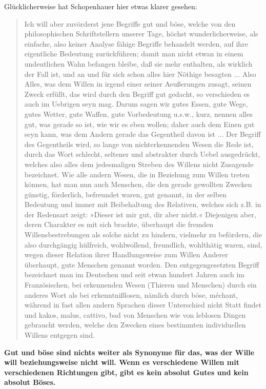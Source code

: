 \documentclass[12pt]{book}
\begin{document}
Glücklicherweise hat Schopenhauer hier etwas klarer gesehen:
\begin{quote}\begin{tcolorbox}
Ich will aber zuvörderst jene Begriffe gut und böse, welche von den philosophischen Schriftstellern unserer Tage, höchst wunderlicherweise, als einfache, also keiner Analyse fähige Begriffe behandelt werden, auf ihre eigentliche Bedeutung zurückführen; damit man nicht etwan in einem undeutlichen Wahn befangen bleibe, daß sie mehr enthalten, als wirklich der Fall ist, und an und für sich schon alles hier Nöthige besagten ...
Also Alles, was dem Willen in irgend einer seiner Aeußerungen zusagt, seinen Zweck erfüllt, das wird durch den Begriff gut gedacht, so verschieden es auch im Uebrigen seyn mag. Darum sagen wir gutes Essen, gute Wege, gutes Wetter, gute Waffen, gute Vorbedeutung u.s.w., kurz, nennen alles gut, was gerade so ist, wie wir es eben wollen; daher auch dem Einen gut seyn kann, was dem Andern gerade das Gegentheil davon ist ...
Der Begriff des Gegentheils wird, so lange von nichterkennenden Wesen die Rede ist, durch das Wort schlecht, seltener und abstrakter durch Uebel ausgedrückt, welches also alles dem jedesmaligen Streben des Willens nicht Zusagende bezeichnet. Wie alle andern Wesen, die in Beziehung zum Willen treten können, hat man nun auch Menschen, die den gerade gewollten Zwecken günstig, förderlich, befreundet waren, gut genannt, in der selben Bedeutung und immer mit Beibehaltung des Relativen, welches sich z.B. in der Redensart zeigt: »Dieser ist mir gut, dir aber nicht.« Diejenigen aber, deren Charakter es mit sich brachte, überhaupt die fremden Willensbestrebungen als solche nicht zu hindern, vielmehr zu befördern, die also durchgängig hülfreich, wohlwollend, freundlich, wohlthätig waren, sind, wegen dieser Relation ihrer Handlungsweise zum Willen Anderer überhaupt, gute Menschen genannt worden. Den entgegengesetzten Begriff bezeichnet man im Deutschen und seit etwan hundert Jahren auch im Französischen, bei erkennenden Wesen (Thieren und Menschen) durch ein anderes Wort als bei erkenntnißlosen, nämlich durch böse, méchant, während in fast allen andern Sprachen dieser Unterschied nicht Statt findet und kakos, malus, cattivo, bad von Menschen wie von leblosen Dingen gebraucht werden, welche den Zwecken eines bestimmten individuellen Willens entgegen sind.
\end{tcolorbox}\end{quote}

\textbf{Gut und böse sind nichts weiter als Synonyme für das, was der Wille will beziehungsweise nicht will. Wenn es verschiedene Willen mit verschiedenen Richtungen gibt, gibt es kein absolut Gutes und kein absolut Böses.}
\end{document}
